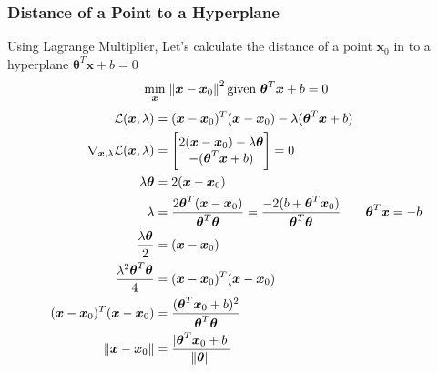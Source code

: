 \documentclass{article}
\renewcommand{\pmb}[1]{\boldsymbol{#1}}
\begin{document}
\subsubsection{Distance of a Point to a Hyperplane}
Using Lagrange Multiplier, Let's calculate the distance of a point $\pmb x_0$ in to a hyperplane $\pmb\theta^T \pmb x + b = 0$
$$\min_{\pmb x}\; \norm{\pmb x - \pmb x_0}^2 \\
\text{given } \pmb\theta^T \pmb x + b = 0
$$
\begin{align*}
	\mathcal{L}(\pmb x, \lambda) &= (\pmb x - \pmb x_0)^T (\pmb x - \pmb x_0) - \lambda (\pmb\theta^T \pmb x + b)\\
	\nabla_{\pmb x, \lambda} \mathcal{L}(\pmb x, \lambda) &= \begin{bmatrix}
		2(\pmb x - \pmb x_0) - \lambda \pmb\theta \\
		- (\pmb\theta^T \pmb x + b)
	\end{bmatrix} = 0 \\
	\lambda \pmb\theta &= 2(\pmb x - \pmb x_0) \\
	\lambda &= \frac{2\pmb\theta^T(\pmb x - \pmb x_0)}{\pmb\theta^T \pmb\theta} = \frac{-2(b + \pmb\theta^T\pmb x_0)}{\pmb\theta^T \pmb\theta} &\pmb\theta^T\pmb x = -b \\
	\frac{\lambda \pmb\theta}{2} &= (\pmb x - \pmb x_0)\\
	\frac{\lambda^2 \pmb\theta^T \pmb\theta}{4} &= (\pmb x - \pmb x_0)^T (\pmb x - \pmb x_0) \\
	(\pmb x - \pmb x_0)^T (\pmb x - \pmb x_0) &= \frac{(\pmb \theta^T \pmb x_0 + b)^2}{\pmb\theta^T \pmb\theta} \\
	\norm{\pmb x - \pmb x_0} &= \frac{|\pmb \theta^T \pmb x_0 + b|}{\norm{\pmb\theta}}
\end{align*}
\end{document}

